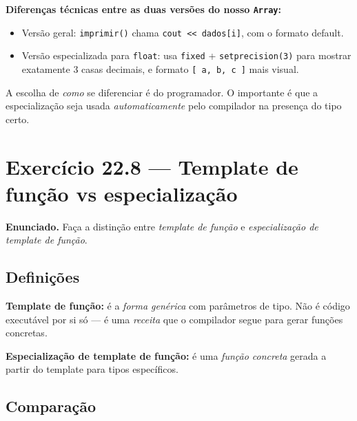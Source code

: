 \documentclass[11pt,a4paper]{article}
\begin{document}
\begin{obseng}
\textbf{Diferen\c{c}as t\'ecnicas entre as duas vers\~oes do nosso \texttt{Array}:}

\begin{itemize}[leftmargin=*,itemsep=0pt]
  \item Vers\~ao geral: \texttt{imprimir()} chama \texttt{cout << dados[i]}, com o formato default.
  \item Vers\~ao especializada para \texttt{float}: usa \texttt{fixed} + \texttt{setprecision(3)} para mostrar exatamente 3 casas decimais, e formato \texttt{[ a, b, c ]} mais visual.
\end{itemize}

A escolha de \emph{como} se diferenciar \'e do programador. O importante \'e que a especializa\c{c}\~ao seja usada \emph{automaticamente} pelo compilador na presen\c{c}a do tipo certo.
\end{obseng}

\newpage
\section{Exerc\'icio 22.8 --- Template de fun\c{c}\~ao vs especializa\c{c}\~ao}

\begin{enunciado}
\textbf{Enunciado.} Fa\c{c}a a distin\c{c}\~ao entre \emph{template de fun\c{c}\~ao} e \emph{especializa\c{c}\~ao de template de fun\c{c}\~ao}.
\end{enunciado}

\subsection*{Defini\c{c}\~oes}

\textbf{Template de fun\c{c}\~ao:} \'e a \emph{forma gen\'erica} com par\^ametros de tipo. N\~ao \'e c\'odigo execut\'avel por si s\'o --- \'e uma \emph{receita} que o compilador segue para gerar fun\c{c}\~oes concretas.

\textbf{Especializa\c{c}\~ao de template de fun\c{c}\~ao:} \'e uma \emph{fun\c{c}\~ao concreta} gerada a partir do template para tipos espec\'ificos.

\subsection*{Compara\c{c}\~ao}
\end{document}
